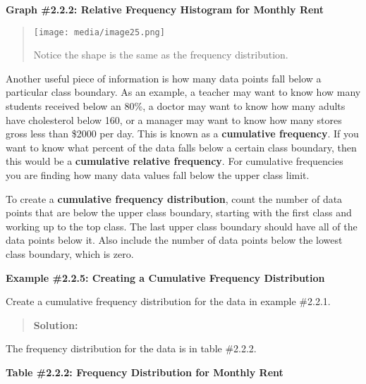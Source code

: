 \documentclass[]{book}
\begin{document}
\textbf{Graph \#2.2.2: Relative Frequency Histogram for Monthly Rent}

\begin{quote}
\texttt{[image: media/image25.png]}

Notice the shape is the same as the frequency distribution.
\end{quote}

Another useful piece of information is how many data points fall below a
particular class boundary. As an example, a teacher may want to know how
many students received below an 80\%, a doctor may want to know how many
adults have cholesterol below 160, or a manager may want to know how
many stores gross less than \$2000 per day. This is known as a
\textbf{cumulative frequency}. If you want to know what percent of the data
falls below a certain class boundary, then this would be a \textbf{cumulative
relative frequency}. For cumulative frequencies you are finding how
many data values fall below the upper class limit.

To create a \textbf{cumulative frequency distribution}, count the number of
data points that are below the upper class boundary, starting with the
first class and working up to the top class. The last upper class
boundary should have all of the data points below it. Also include the
number of data points below the lowest class boundary, which is zero.

\textbf{Example \#2.2.5: Creating a Cumulative Frequency Distribution}

Create a cumulative frequency distribution for the data in example
\#2.2.1.

\begin{quote}
\textbf{Solution:}
\end{quote}

The frequency distribution for the data is in table \#2.2.2.

\textbf{Table \#2.2.2: Frequency Distribution for Monthly Rent}
\end{document}
